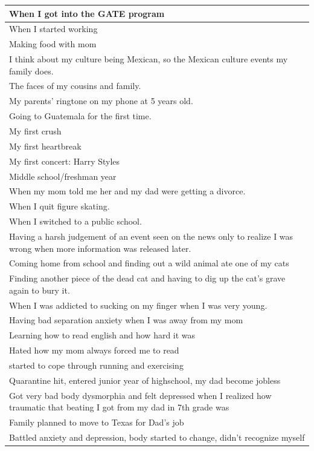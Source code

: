 \documentclass[
  .7em,
  letterpaper,
  DIV=11,
  numbers=noendperiod]{scrartcl}
\begin{document}
\begin{table}
\begin{tabular}{l}
\hline
When I got into the GATE program\\
\hline
When I started working\\
\hline
Making food with mom\\
\hline
I think about my culture being Mexican, so the Mexican culture events my family does.\\
\hline
The faces of my cousins and family.\\
\hline
My parents' ringtone on my phone at 5 years old.\\
\hline
Going to Guatemala for the first time.\\
\hline
My first crush\\
\hline
My first heartbreak\\
\hline
My first concert: Harry Styles\\
\hline
Middle school/freshman year\\
\hline
When my mom told me her and my dad were getting a divorce.\\
\hline
When I quit figure skating.\\
\hline
When I switched to a public school.\\
\hline
Having a harsh judgement of an event seen on the news only to realize I was wrong when more information was released later.\\
\hline
Coming home from school and finding out a wild animal ate one of my cats\\
\hline
Finding another piece of the dead cat and having to dig up the cat's grave again to bury it.\\
\hline
When I was addicted to sucking on my finger when I was very young.\\
\hline
Having bad separation anxiety when I was away from my mom\\
\hline
Learning how to read english and how hard it was\\
\hline
Hated how my mom always forced me to read\\
\hline
started to cope through running and exercising\\
\hline
Quarantine hit, entered junior year of highschool,  my dad become jobless\\
\hline
Got very bad body dysmorphia and felt depressed when I realized how traumatic that beating I got from my dad in 7th grade was\\
\hline
Family planned to move to Texas for Dad's job\\
\hline
Battled anxiety and depression, body started to change, didn't recognize myself\\

\end{tabular}
\end{table}
\end{document}
